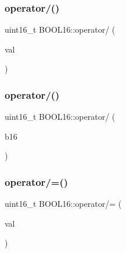 \hypertarget{struct_b_o_o_l16_a2cb6c702a1bbc8aa53bdb991135b1906}{}\label{struct_b_o_o_l16_a2cb6c702a1bbc8aa53bdb991135b1906} 
\subsubsection{\texorpdfstring{operator/()}{operator/()}\hspace{0.1cm}{\footnotesize\ttfamily [1/2]}}
{\footnotesize\ttfamily uint16\+\_\+t B\+O\+O\+L16\+::operator/ (\begin{DoxyParamCaption}\item[{const uint16\+\_\+t}]{val }\end{DoxyParamCaption})\hspace{0.3cm}{\ttfamily [inline]}}

\hypertarget{struct_b_o_o_l16_ac7d29d83718de6f76c22a7883472f77c}{}\label{struct_b_o_o_l16_ac7d29d83718de6f76c22a7883472f77c} 
\subsubsection{\texorpdfstring{operator/()}{operator/()}\hspace{0.1cm}{\footnotesize\ttfamily [2/2]}}
{\footnotesize\ttfamily uint16\+\_\+t B\+O\+O\+L16\+::operator/ (\begin{DoxyParamCaption}\item[{const \hyperlink{struct_b_o_o_l16}{B\+O\+O\+L16}}]{b16 }\end{DoxyParamCaption})\hspace{0.3cm}{\ttfamily [inline]}}

\hypertarget{struct_b_o_o_l16_a87fbb17dc443d61757966bbdb8ea171d}{}\label{struct_b_o_o_l16_a87fbb17dc443d61757966bbdb8ea171d} 
\subsubsection{\texorpdfstring{operator/=()}{operator/=()}\hspace{0.1cm}{\footnotesize\ttfamily [1/2]}}
{\footnotesize\ttfamily uint16\+\_\+t B\+O\+O\+L16\+::operator/= (\begin{DoxyParamCaption}\item[{const uint16\+\_\+t}]{val }\end{DoxyParamCaption})\hspace{0.3cm}{\ttfamily [inline]}}

